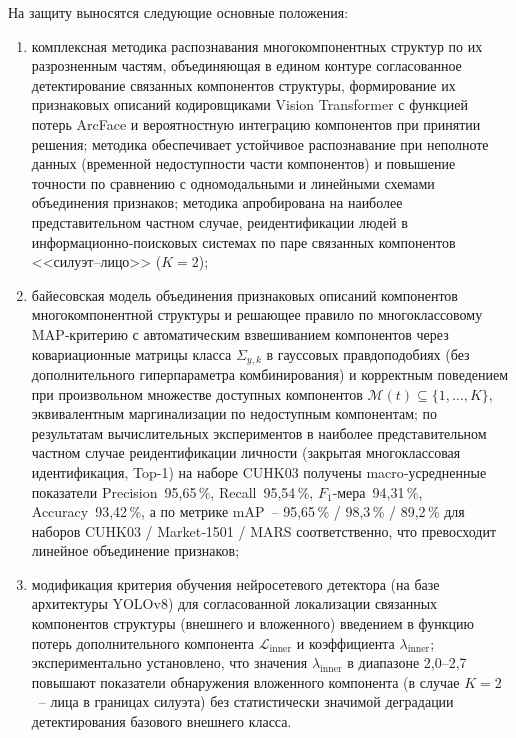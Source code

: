 На защиту выносятся следующие основные положения:
\begin{enumerate}
    \item комплексная методика распознавания многокомпонентных структур по
    их разрозненным частям, объединяющая в едином контуре согласованное
    детектирование связанных компонентов структуры, формирование их
    признаковых описаний кодировщиками Vision Transformer с функцией потерь
    ArcFace и вероятностную интеграцию компонентов при принятии решения;
    методика обеспечивает устойчивое распознавание при неполноте данных
    (временной недоступности части компонентов) и повышение точности по
    сравнению с одномодальными и линейными схемами объединения признаков;
    методика апробирована на наиболее представительном частном случае,
    реидентификации людей в информационно‑поисковых системах по паре
    связанных компонентов <<силуэт--лицо>> ($K=2$);

    \item байесовская модель объединения признаковых описаний компонентов
    многокомпонентной структуры и решающее правило по многоклассовому
    MAP‑критерию с автоматическим взвешиванием компонентов через
    ковариационные матрицы класса $\Sigma_{y,k}$ в гауссовых
    правдоподобиях (без дополнительного гиперпараметра комбинирования) и
    корректным поведением при произвольном множестве доступных компонентов
    $\mathcal{M}(t)\subseteq\{1,\ldots,K\}$, эквивалентным маргинализации по
    недоступным компонентам; по результатам вычислительных экспериментов в
    наиболее представительном частном случае реидентификации личности
    (закрытая многоклассовая идентификация, Top-1) на наборе CUHK03 получены
    macro‑усредненные показатели Precision~95,65\,\%, Recall~95,54\,\%,
    $F_1$‑мера~94,31\,\%, Accuracy~93,42\,\%, а по метрике mAP~--
    95,65\,\% / 98,3\,\% / 89,2\,\% для наборов CUHK03 / Market‑1501 /
    MARS соответственно, что превосходит линейное объединение признаков;

    \item модификация критерия обучения нейросетевого детектора (на базе
    архитектуры YOLOv8) для согласованной локализации связанных
    компонентов структуры (внешнего и вложенного) введением в функцию
    потерь дополнительного компонента $\mathcal{L}_{\text{inner}}$ и
    коэффициента $\lambda_{\text{inner}}$; экспериментально установлено,
    что значения $\lambda_{\text{inner}}$ в диапазоне 2,0--2,7 повышают
    показатели обнаружения вложенного компонента (в случае $K=2$~-- лица в
    границах силуэта) без статистически значимой деградации детектирования
    базового внешнего класса.
\end{enumerate}

